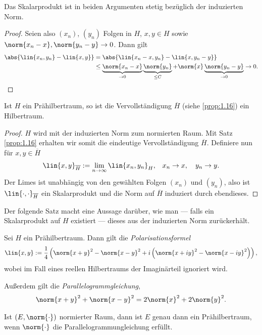 \begin{lem}
\label{lem:5.7}
Das Skalarprodukt ist in beiden Argumenten stetig bezüglich der induzierten
Norm.\fishhere
\end{lem}
\begin{proof}
Seien also $(x_n)$, $(y_n)$ Folgen in $H$, $x,y\in H$ sowie
$\norm{x_n-x},\norm{y_n-y}\to 0$. Dann gilt
\begin{align*}
\abs{\lin{x_n,y_n}-\lin{x,y}} &=\abs{\lin{x_n-x,y_n}- \lin{x,y_n-y}}
\\ &\le \underbrace{\norm{x_n-x}}_{\to0}\underbrace{\norm{y_n}}_{\le C} +
\norm{x}\underbrace{\norm{y_n-y}}_{\to0} \to 0.\qedhere
\end{align*}
\end{proof}

\begin{prop}
\label{prop:5.8}
Ist $H$ ein Prähilbertraum, so ist die Vervollständigung $\overline{H}$ (siehe
\ref{prop:1.16}) ein Hilbertraum.\fishhere
\end{prop}
\begin{proof}
$H$ wird mit der induzierten Norm zum normierten Raum. Mit Satz \ref{prop:1.16}
erhalten wir somit die eindeutige Vervollständigung $\overline{H}$. Definiere
nun für $x,y\in\overline{H}$
\begin{align*}
\lin{x,y}_{\overline{H}} := \lim\limits_{n\to\infty}\lin{x_n,y_n}_H, &&
x_n\to x,\quad y_n\to y.
\end{align*}
Der Limes ist unabhängig von den gewählten Folgen $(x_n)$ und $(y_n)$, also ist
$\lin{\cdot,\cdot}_{\overline{H}}$ ein Skalarprodukt und die Norm auf
$\overline{H}$ induziert durch ebendieses.\qedhere
\end{proof}

Der folgende Satz macht eine Aussage darüber, wie man --- falls ein
Skalarprodukt auf $H$ existiert --- dieses aus der induzierten Norm
zurückerhält.
\begin{prop}
\label{prop:5.9}
\begin{propenum}
  \item 
Sei $H$ ein Prähilbertraum. Dann gilt die \emph{Polarisationsformel}
\begin{align*}
\lin{x,y} :=
\frac{1}{4}\left(\norm{x+y}^2 - \norm{x-y}^2 + i\left(\norm{x+iy}^2 -
\norm{x-iy}^2\right)\right),%
\end{align*}
wobei im Fall eines reellen Hilbertraums der Imaginärteil ignoriert wird.

Außerdem gilt die \emph{Parallelogrammgleichung},
\begin{align*}
\norm{x+y}^2 + \norm{x-y}^2 = 2\norm{x}^2 + 2\norm{y}^2.
\end{align*}
\item Ist $(E,\norm{\cdot})$ normierter Raum, dann ist $E$ genau dann ein
Prähilbertraum, wenn $\norm{\cdot}$ die Parallelogrammungleichung
erfüllt.\fishhere
\end{propenum}
\end{prop}

